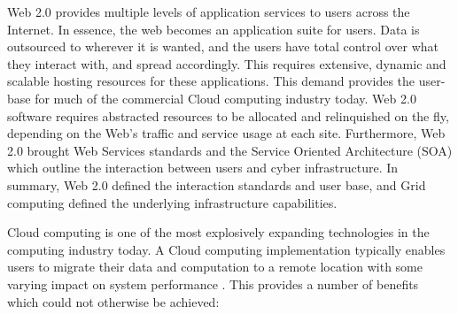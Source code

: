 Web 2.0 provides multiple levels of application services to users across the Internet.  In essence, the web becomes an application suite for users.  Data is outsourced to wherever it is wanted, and the users have total control over what they interact with, and spread accordingly.  This requires extensive, dynamic and scalable hosting resources for these applications. This demand provides the user-base for much of the commercial Cloud computing industry today.  Web 2.0 software requires abstracted resources to be allocated and relinquished on the fly, depending on the Web's traffic and service usage at each site.  Furthermore, Web 2.0 brought Web Services standards \cite{wsci} and the Service Oriented Architecture (SOA) \cite{krafzig2004} which outline the interaction between users and cyber infrastructure.  In summary, Web 2.0 defined the interaction standards and user base, and Grid computing defined the underlying infrastructure capabilities.  

Cloud computing \cite{Armbrust2010} is one of the most explosively expanding technologies in the computing industry today. A Cloud computing implementation typically enables users to migrate their data and computation to a remote location with some varying impact on system performance \cite{wang2010ngc}.  This provides a number of benefits which could not otherwise be achieved:  


